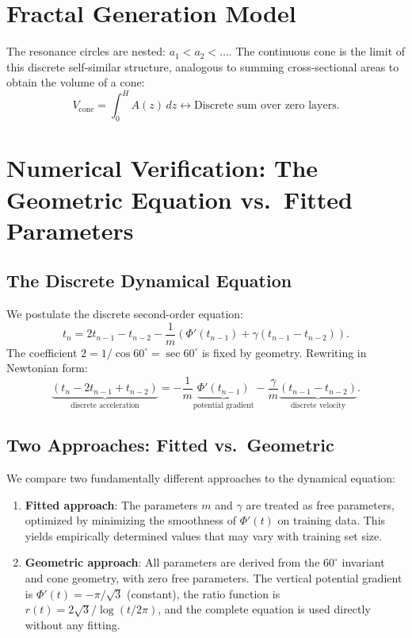 \documentclass[12pt,a4paper]{article}
\begin{document}
\section{Fractal Generation Model}

The resonance circles are nested: $a_1 < a_2 < \dots$. The continuous cone is the limit of this discrete self-similar structure, analogous to summing cross-sectional areas to obtain the volume of a cone:
\begin{equation}
V_{\text{cone}} = \int_0^H A(z)\,dz \longleftrightarrow \text{Discrete sum over zero layers}.
\end{equation}

\section{Numerical Verification: The Geometric Equation vs.\ Fitted Parameters}

\subsection{The Discrete Dynamical Equation}

We postulate the discrete second-order equation:
\begin{equation}
t_n = 2t_{n-1} - t_{n-2} - \frac{1}{m}\left(\Phi'(t_{n-1}) + \gamma(t_{n-1} - t_{n-2})\right). \label{eq:main}
\end{equation}
The coefficient $2 = 1/\cos 60^\circ = \sec 60^\circ$ is fixed by geometry. Rewriting in Newtonian form:
\begin{equation}
\underbrace{(t_n - 2t_{n-1} + t_{n-2})}_{\text{discrete acceleration}} = -\frac{1}{m}\underbrace{\Phi'(t_{n-1})}_{\text{potential gradient}} - \frac{\gamma}{m}\underbrace{(t_{n-1} - t_{n-2})}_{\text{discrete velocity}}.
\end{equation}

\subsection{Two Approaches: Fitted vs.\ Geometric}

We compare two fundamentally different approaches to the dynamical equation:

\begin{enumerate}
\item \textbf{Fitted approach}: The parameters $m$ and $\gamma$ are treated as free parameters, optimized by minimizing the smoothness of $\Phi'(t)$ on training data. This yields empirically determined values that may vary with training set size.
\item \textbf{Geometric approach}: All parameters are derived from the $60^\circ$ invariant and cone geometry, with zero free parameters. The vertical potential gradient is $\Phi'(t) = -\pi/\sqrt{3}$ (constant), the ratio function is $r(t) = 2\sqrt{3}/\log(t/2\pi)$, and the complete equation is used directly without any fitting.
\end{enumerate}
\end{document}
